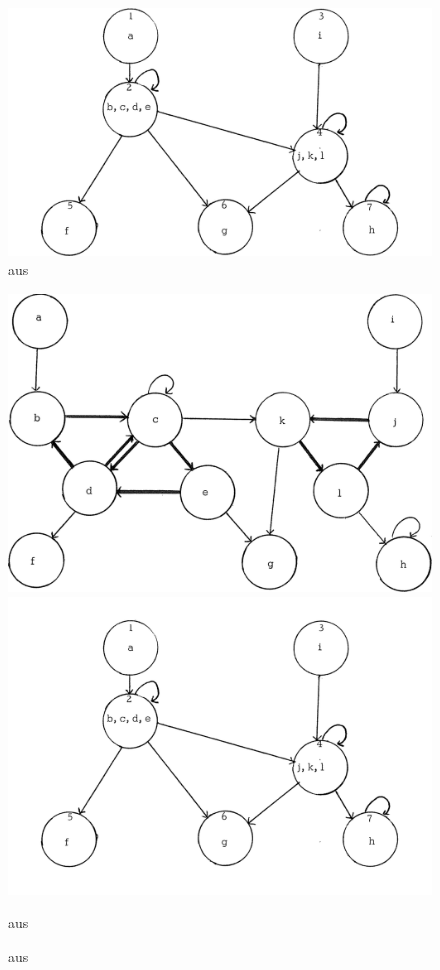 \begin{figure}[H]
    \centering
    \includegraphics[width=.45\linewidth]{../img/purdom_g2.png}
    \caption{aus \citep[Seite 78]{purdom1970transitive}}
\end{figure}

\begin{figure}[H]
    \centering
    \includegraphics[width=.49\linewidth]{../img/purdom_g1.png}
    \includegraphics[width=.49\linewidth]{../img/purdom_g2b.png}
    \caption{aus \citep[Seite 78]{purdom1970transitive}}
\end{figure}

\newpage

\begin{figure}[H]
    \centering
    \setlength{\fboxsep}{10pt}\color{black!20}
    \normalcolor\caption{aus \citep[Seite 200]{jakobsson1991mixed}}
\end{figure}





